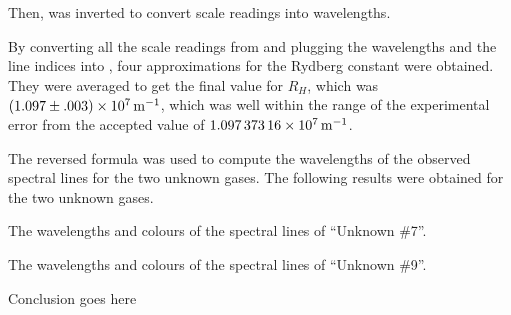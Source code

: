 \begin{paper}
Then, \eqHartmann was inverted to convert scale readings into wavelengths.


By converting all the scale readings from \figHydrogen and plugging the
wavelengths and the line indices into \eqRydberg, four approximations
for the Rydberg constant were obtained.
They were averaged to get the final value for $R_H$, which was
$(1.097\pm.003)\times\SI{E7}{\per\meter}$, which was well within the range of the
experimental error from the accepted value of $\SI{1.09737316E7}{\per\meter}$.

The reversed formula was used to compute the wavelengths of the observed
spectral lines for the two unknown gases.
The following results were obtained for the two unknown gases.

{The wavelengths and colours of the spectral lines of ``Unknown \#7''.}\vspace{1em}

{The wavelengths and colours of the spectral lines of ``Unknown \#9''.}


Conclusion goes here


\end{paper}
